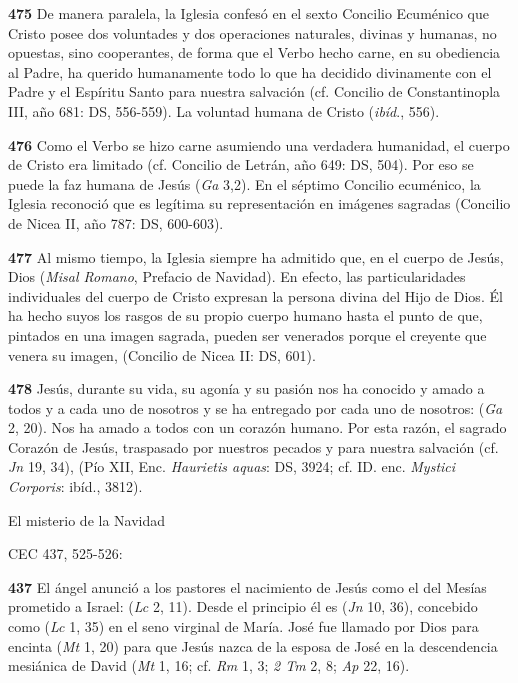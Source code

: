 \textbf{475} De manera paralela, la Iglesia confesó en el sexto Concilio Ecuménico que Cristo posee dos voluntades y dos operaciones naturales, divinas y humanas, no opuestas, sino cooperantes, de forma que el Verbo hecho carne, en su obediencia al Padre, ha querido humanamente todo lo que ha decidido divinamente con el Padre y el Espíritu Santo para nuestra salvación (cf. Concilio de Constantinopla III, año 681: DS, 556-559). La voluntad humana de Cristo  (\emph{ibíd}., 556).

\textbf{476} Como el Verbo se hizo carne asumiendo una verdadera humanidad, el cuerpo de Cristo era limitado (cf. Concilio de Letrán, año 649: DS, 504). Por eso se puede  la faz humana de Jesús (\emph{Ga} 3,2). En el séptimo Concilio ecuménico, la Iglesia reconoció que es legítima su representación en imágenes sagradas (Concilio de Nicea II, año 787: DS, 600-603).

\textbf{477} Al mismo tiempo, la Iglesia siempre ha admitido que, en el cuerpo de Jesús, Dios  (\emph{Misal Romano}, Prefacio de Navidad). En efecto, las particularidades individuales del cuerpo de Cristo expresan la persona divina del Hijo de Dios. Él ha hecho suyos los rasgos de su propio cuerpo humano hasta el punto de que, pintados en una imagen sagrada, pueden ser venerados porque el creyente que venera su imagen,  (Concilio de Nicea II: DS, 601).

\textbf{478} Jesús, durante su vida, su agonía y su pasión nos ha conocido y amado a todos y a cada uno de nosotros y se ha entregado por cada uno de nosotros:  (\emph{Ga} 2, 20). Nos ha amado a todos con un corazón humano. Por esta razón, el sagrado Corazón de Jesús, traspasado por nuestros pecados y para nuestra salvación (cf. \emph{Jn} 19, 34),  (Pío XII, Enc. \emph{Haurietis aquas}: DS, 3924; cf. ID. enc. \emph{Mystici Corporis}: ibíd., 3812).

El misterio de la Navidad

CEC 437, 525-526:

\textbf{437} El ángel anunció a los pastores el nacimiento de Jesús como el del Mesías prometido a Israel:  (\emph{Lc} 2, 11). Desde el principio él es  (\emph{Jn} 10, 36), concebido como  (\emph{Lc} 1, 35) en el seno virginal de María. José fue llamado por Dios para  encinta  (\emph{Mt} 1, 20) para que Jesús  nazca de la esposa de José en la descendencia mesiánica de David (\emph{Mt} 1, 16; cf. \emph{Rm} 1, 3; \emph{2 Tm} 2, 8; \emph{Ap} 22, 16).

